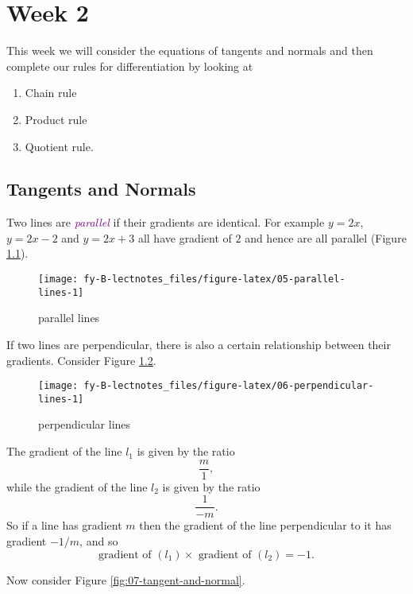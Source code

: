 \documentclass[
  english,
  11pt,
  oneside]{book}
\providecommand{\tightlist}{%
  \setlength{\itemsep}{0pt}\setlength{\parskip}{0pt}}
\newcommand{\slide}{}
\theoremstyle{definition}
\theoremstyle{definition}
\theoremstyle{definition}
\theoremstyle{definition}
\theoremstyle{remark}
\begin{document}
\chapter{Week 2}\label{week-two}

This week we will consider the equations of tangents and normals and then complete our rules for differentiation by looking at

\begin{enumerate}
\def\labelenumi{\arabic{enumi}.}
\tightlist
\item
  Chain rule
\item
  Product rule
\item
  Quotient rule.
\end{enumerate}

\slide

\section{Tangents and Normals}\label{lecture-four}

Two lines are \textcolor{purple}{\em parallel} if their gradients are identical. For example \(y=2x\), \(y=2x-2\) and \(y=2x+3\) all have gradient of \(2\) and hence are all parallel (Figure \ref{fig:05-parallel-lines}).

\begin{figure}

{\centering \texttt{[image: fy-B-lectnotes\_files/figure-latex/05-parallel-lines-1]} 

}

\caption{parallel lines}\label{fig:05-parallel-lines}
\end{figure}
\slide

If two lines are perpendicular, there is also a certain relationship between their gradients. Consider Figure \ref{fig:06-perpendicular-lines}.

\begin{figure}

{\centering \texttt{[image: fy-B-lectnotes\_files/figure-latex/06-perpendicular-lines-1]} 

}

\caption{perpendicular lines}\label{fig:06-perpendicular-lines}
\end{figure}
\slide

The gradient of the line \(l_1\) is given by the ratio
\[
\frac{m}{1},
\]
while the gradient of the line \(l_2\) is given by the ratio
\[
\frac{1}{-m}.
\]
So if a line has gradient \(m\) then the gradient of the line perpendicular to it has gradient \(-1/m\), and so
\[
\text{gradient of }(l_1) \times \text{ gradient of }(l_2) = -1.
\]
\slide
Now consider Figure \ref{fig:07-tangent-and-normal}.
\end{document}
